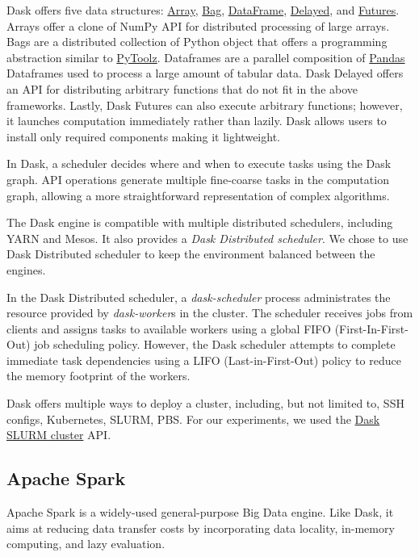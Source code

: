 \documentclass[conference]{IEEEtran}
\begin{document}
Dask offers five data structures:
\href{https://docs.dask.org/en/latest/array.html}{Array},
\href{https://docs.dask.org/en/latest/bag.html}{Bag},
\href{https://docs.dask.org/en/latest/dataframe.html}{DataFrame},
\href{https://docs.dask.org/en/latest/delayed.html}{Delayed},
and \href{https://docs.dask.org/en/latest/futures.html}{Futures}.
Arrays offer a clone of NumPy API for distributed processing of large arrays.
Bags are a distributed collection of Python object that offers a programming abstraction similar to \href{https://toolz.readthedocs.io/en/latest/}{PyToolz}.
Dataframes are a parallel composition of \href{https://pandas.pydata.org/}{Pandas} Dataframes used to process a large amount of tabular data.
Dask Delayed offers an API for distributing arbitrary functions that do not fit in the above frameworks.
Lastly, Dask Futures can also execute arbitrary functions; however, it launches computation immediately rather than lazily.
Dask allows users to install only required components making it lightweight.

In Dask, a scheduler decides where and when to execute tasks using the Dask graph.
API operations generate multiple fine-coarse tasks in the computation graph, allowing a more straightforward representation of complex algorithms.

The Dask engine is compatible with multiple distributed schedulers, including YARN and Mesos.
It also provides a \textit{Dask Distributed scheduler}.
We chose to use Dask Distributed scheduler to keep the environment balanced between the engines.

In the Dask Distributed scheduler, a \textit{dask-scheduler} process administrates the resource provided by \textit{dask-worker}s in the cluster.
The scheduler receives jobs from clients and assigns tasks to available workers using a global FIFO (First-In-First-Out) job scheduling policy.
However, the Dask scheduler attempts to complete immediate task dependencies using a LIFO (Last-in-First-Out) policy to reduce the memory footprint of the workers.

Dask offers multiple ways to deploy a cluster, including, but not limited to, SSH configs, Kubernetes, SLURM, PBS.
For our experiments, we used the \href{https://jobqueue.dask.org/en/latest/generated/dask_jobqueue.SLURMCluster.html}{Dask SLURM cluster} API.

\subsection{Apache Spark}
Apache Spark is a widely-used general-purpose Big Data engine.
Like Dask, it aims at reducing data transfer costs by incorporating data locality, in-memory computing, and lazy evaluation.
\end{document}

